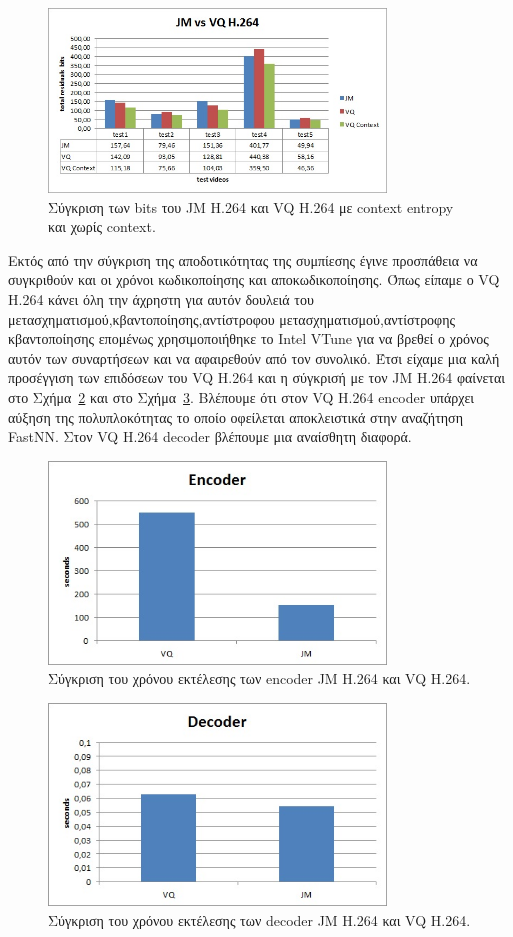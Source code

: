 \begin{figure}[H]
    \centering
    \includegraphics[width=0.8\textwidth]{chapter6/compare1.jpg}
    \caption{Σύγκριση των bits του JM H.264 και VQ H.264 με context entropy και χωρίς context.}
    \label{fig:compare1}
\end{figure}

\indent Εκτός από την σύγκριση της αποδοτικότητας της συμπίεσης έγινε προσπάθεια να συγκριθούν και οι χρόνοι κωδικοποίησης και αποκωδικοποίησης. Όπως είπαμε ο VQ Η.264 κάνει όλη την άχρηστη για αυτόν δουλειά του μετασχηματισμού,κβαντοποίησης,αντίστροφου μετασχηματισμού,αντίστροφης κβαντοποίησης επομένως χρησιμοποιήθηκε το Intel VTune για να βρεθεί ο χρόνος αυτόν των συναρτήσεων και να αφαιρεθούν από τον συνολικό. Έτσι είχαμε μια καλή προσέγγιση των επιδόσεων του VQ H.264 και η σύγκρισή με τον JM H.264 φαίνεται στο Σχήμα~\ref{fig:compare2} και στο Σχήμα~\ref{fig:compare3}. Βλέπουμε ότι στον VQ H.264 encoder υπάρχει αύξηση της πολυπλοκότητας το οποίο οφείλεται αποκλειστικά στην αναζήτηση FastNN. Στον VQ H.264 decoder βλέπουμε μια αναίσθητη διαφορά.

 \begin{figure}[H]
    \centering
    \includegraphics[width=0.8\textwidth]{chapter6/compare2.jpg}
    \caption{Σύγκριση του χρόνου εκτέλεσης των encoder JM H.264 και VQ H.264.}
    \label{fig:compare2}
\end{figure}

 \begin{figure}[H]
    \centering
    \includegraphics[width=0.8\textwidth]{chapter6/compare3.jpg}
    \caption{Σύγκριση του χρόνου εκτέλεσης των decoder JM H.264 και VQ H.264.}
    \label{fig:compare3}
\end{figure} 